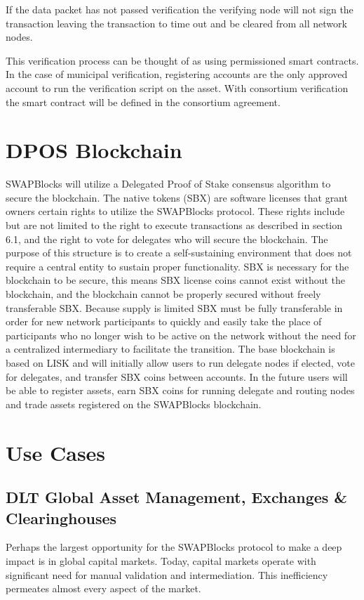 \documentclass[12pt]{article}
\begin{document}
If the data packet has not passed verification the verifying node will not sign the transaction
leaving the transaction to time out and be cleared from all network nodes.

This verification process can be thought of as using permissioned smart contracts.  In the case of municipal
verification, registering accounts are the only approved account to run the verification script on the asset.
With consortium verification the smart contract will be defined in the consortium agreement.


\section{DPOS Blockchain}
SWAPBlocks will utilize a Delegated Proof of Stake consensus algorithm to secure the blockchain. The native 
tokens (SBX) are software licenses that grant owners certain rights to utilize the SWAPBlocks protocol. These 
rights include but are not limited to the right to execute transactions as described in section 6.1, and 
the right to vote for delegates who will secure the blockchain. The purpose of this structure is to create a 
self-sustaining environment that does not require a central entity to sustain proper functionality. SBX is necessary 
for the blockchain to be secure, this means SBX license coins cannot exist without the blockchain, and the 
blockchain cannot be properly secured without freely transferable SBX. 
Because supply is limited SBX must be fully transferable in order for new network participants to quickly and easily take the place of participants who no longer wish to be active on the network without the need for 
a centralized intermediary to facilitate the transition. The base blockchain is based on LISK and will initially allow 
users to run delegate nodes if elected, vote for delegates, and transfer SBX coins between accounts. In the future 
users will be able to register assets, earn SBX coins for running delegate and routing nodes and trade assets 
registered on the SWAPBlocks blockchain.  


\pagebreak

\section{Use Cases}

\subsection{DLT Global Asset Management, Exchanges \& Clearinghouses}
Perhaps the largest opportunity for the SWAPBlocks protocol to make a deep impact is in global capital markets. Today, 
capital markets operate with significant need for manual validation and intermediation. This inefficiency permeates 
almost every aspect of the market.
\end{document}
